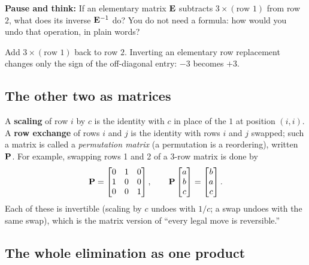 \begin{recoverybox}
\textbf{Pause and think:} If an elementary matrix $\mathbf{E}$ subtracts $3\times(\text{row } 1)$ from row $2$, what does its inverse $\mathbf{E}^{-1}$ do? You do not need a formula: how would you undo that operation, in plain words?
\end{recoverybox}

Add $3\times(\text{row } 1)$ back to row $2$. Inverting an elementary row replacement changes only the sign of the off-diagonal entry: $-3$ becomes $+3$.

\subsection{The other two as matrices}

A \textbf{scaling} of row $i$ by $c$ is the identity with $c$ in place of the
$1$ at position $(i,i)$. A \textbf{row exchange} of rows $i$ and $j$ is the
identity with rows $i$ and $j$ swapped; such a matrix is called a
\emph{permutation matrix} (a permutation is a reordering), written $\mathbf{P}$. For example, swapping rows 1 and 2
of a $3$-row matrix is done by
\[
\mathbf{P}=\begin{bmatrix}0&1&0\\1&0&0\\0&0&1\end{bmatrix},
\qquad
\mathbf{P}\begin{bmatrix}a\\b\\c\end{bmatrix}
=\begin{bmatrix}b\\a\\c\end{bmatrix}.
\]
Each of these is invertible (scaling by $c$ undoes with $1/c$; a swap undoes with
the same swap), which is the matrix version of ``every legal move is
reversible.''

\subsection{The whole elimination as one product}


